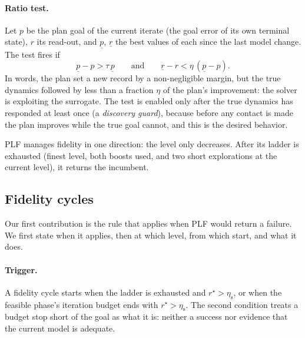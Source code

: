 \documentclass[11pt]{article}
\theoremstyle{remark}
\newcommand{\etas}{\eta_{\mathrm{s}}}
\newcommand{\rinc}{r^\star}
\begin{document}
\paragraph{Ratio test.} Let $p$ be the plan goal of the current iterate (the goal error of its own terminal state), $r$ its read-out, and $\underline p$, $\underline r$ the best values of each since the last model change. The test fires if
\begin{equation}
\label{eq:ratio}
\underline p - p > \tau\, \underline p \qquad\text{and}\qquad \underline r - r < \eta\,(\underline p - p).
\end{equation}
In words, the plan set a new record by a non-negligible margin, but the true dynamics followed by less than a fraction $\eta$ of the plan's improvement: the solver is exploiting the surrogate. The test is enabled only after the true dynamics has responded at least once (a \emph{discovery guard}), because before any contact is made the plan improves while the true goal cannot, and this is the desired behavior.

PLF manages fidelity in one direction: the level only decreases. After its ladder is exhausted (finest level, both boosts used, and two short explorations at the current level), it returns the incumbent.

\subsection{Fidelity cycles}
\label{sec:cycles}

Our first contribution is the rule that applies when PLF would return a failure. We first state when it applies, then at which level, from which start, and what it does.

\paragraph{Trigger.} A fidelity cycle starts when the ladder is exhausted and $\rinc > \etas$, or when the feasible phase's iteration budget ends with $\rinc > \etas$. The second condition treats a budget stop short of the goal as what it is: neither a success nor evidence that the current model is adequate.
\end{document}
